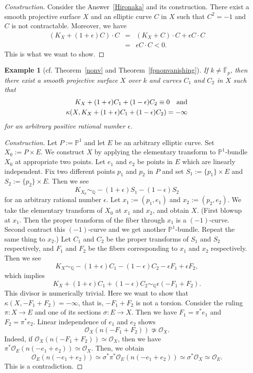 \documentclass[12pt,twoside]{amsart}
\newtheorem{ex}[thm]{Example}
\theoremstyle{definition}
\newcommand{\pr}[1]{$\mathbb{P}^#1$}
\begin{document}
\begin{proof}[Construction]
Consider the Answer~\ref{Hironaka} and its construction. 
There exist a smooth projective surface $X$ and 
an elliptic curve $C$ in $X$ such that 
$C^2=-1$ and $C$ is not contractable. 
Moreover, we have 
\begin{eqnarray*}
(K_X+(1+\epsilon)C)\cdot C
&=&(K_X+C)\cdot C+\epsilon C\cdot C\\
&=&\epsilon C\cdot C<0.
\end{eqnarray*} 
This is what we want to show.
\end{proof}


\begin{ex}[cf. Theorem~\ref{nonv} and Theorem~\ref{fpnonvanishing}]
If $k\neq\overline{\mathbb{F}}_p$, then 
there exist a smooth projective surface $X$ over $k$ and 
curves $C_1$ and $C_2$ in $X$ such that 
\begin{eqnarray*}
K_X+(1+\epsilon)C_1+(1-\epsilon)C_2 \equiv 0\,\,\,\,\,\,{\rm and}\\
\kappa(X, K_X+(1+\epsilon)C_1+(1-\epsilon)C_2)=-\infty
\end{eqnarray*}
for an arbitrary positive rational number $\epsilon$.
\end{ex}

\begin{proof}[Construction]
Let $P:=\mathbb{P}^1$ and let $E$ be an arbitrary elliptic curve. 
Set $X_0:=P \times E$. 
We construct $X$ by applying 
the elementary transform to \pr1-bundle $X_0$ at appropriate two points. 
Let $e_1$ and $e_2$ be points in $E$ which are linearly independent. 
Fix two different points $p_1$ and $p_2$ in $P$ and 
set $S_1:=\{p_1\} \times E$ and $S_2:=\{p_2\} \times E$. 
Then we see 
$$K_{X_0} \sim_{\mathbb{Q}}-(1+\epsilon)S_1-(1-\epsilon)S_2$$ 
for an arbitrary rational number $\epsilon$. 
Let $x_1:=(p_1, e_1)$ and $x_2:=(p_2, e_2)$. 
We take the elementary transform of $X_0$ at $x_1$ and $x_2$, 
and obtain $X$. 
(First blowup at $x_1$. 
Then the proper transform of the fiber 
through $x_1$ is a $(-1)$-curve. 
Second contract this $(-1)$-curve and we get another \pr1-bundle.
Repeat the same thing to $x_2$.) 
Let $C_1$ and $C_2$ be 
the proper transforms of $S_1$ and $S_2$ respectively, and  
$F_1$ and $F_2$ be the fibers corresponding to $x_1$ and $x_2$ respectively. 
Then we see 
$$K_X \sim_{\mathbb{Q}}
-(1+\epsilon)C_1-(1-\epsilon)C_2-\epsilon F_1+\epsilon F_2,$$ 
which implies 
$$K_X+(1+\epsilon)C_1+(1-\epsilon)C_2 \sim_{\mathbb{Q}} 
\epsilon (-F_1+F_2).$$ 
This divisor is numerically trivial. 
Here we want to show that $\kappa(X, -F_1+F_2)=-\infty$, 
that is, $-F_1+F_2$ is not a torsion. 
Consider the ruling $\pi: X \to E$ and
one of its sections $\sigma: E \to X$. 
Then we have $F_1=\pi^*e_1$ and $F_2=\pi^*e_2$. 
Linear independence of $e_1$ and $e_2$ shows 
$$\mathcal O_X(n(-F_1+F_2)) \not\simeq \mathcal O_X.$$ 
Indeed, if $\mathcal O_X(n(-F_1+F_2)) \simeq \mathcal O_X$, 
then we have $\pi^*\mathcal O_E(n(-e_1+e_2)) \simeq \mathcal O_X$. 
Then, we obtain 
$$\mathcal O_E(n(-e_1+e_2))\simeq \sigma^*\pi^*\mathcal O_E(n(-e_1+e_2)) 
\simeq \sigma^*\mathcal O_X \simeq \mathcal O_E.$$ 
This is a contradiction.
\end{proof}
\end{document}
